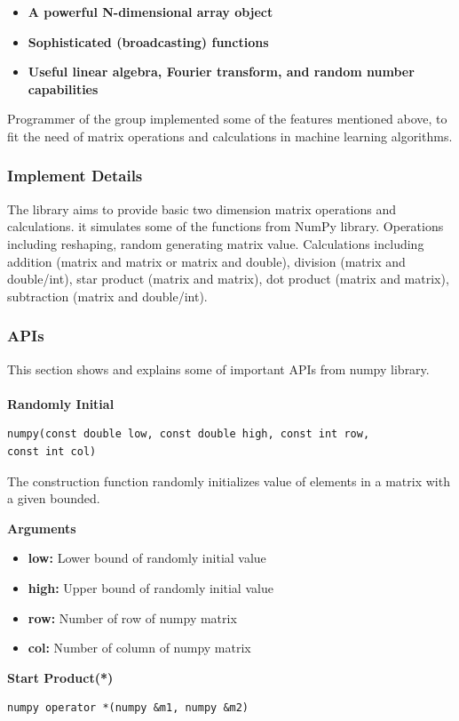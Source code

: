 \documentclass[a4paper]{article}
\begin{document}
\begin{itemize}
	\item{\textbf{A powerful N-dimensional array object}}
    \item{\textbf{Sophisticated (broadcasting) functions} }
    \item{\textbf{Useful linear algebra, Fourier transform, and random number capabilities} }
\end{itemize}

Programmer of the group implemented some of the features mentioned above, to fit the need of matrix operations and calculations in machine learning algorithms.    


\subsubsection{Implement Details}
The library aims to provide basic two dimension matrix operations and calculations. it simulates some of the functions from NumPy library. Operations including reshaping, random generating matrix value. Calculations including addition (matrix and matrix or matrix and double), division (matrix and double/int), star product (matrix and matrix), dot product (matrix and matrix), subtraction (matrix and double/int).

\subsubsection{APIs}                                                                    
This section shows and explains some of important APIs from numpy library.\\\\
\textbf{\Large Randomly Initial}\\           
\begin{lstlisting}[language={[ANSI]C++},keywordstyle=\color{blue!70},commentstyle=\color{red!50!green!50!blue!50},frame=shadowbox, rulesepcolor=\color{red!20!green!20!blue!20}]
numpy(const double low, const double high, const int row, 
const int col)
\end{lstlisting}

The construction function randomly initializes value of elements in a matrix with a given bounded.

\textbf{Arguments}
\begin{itemize}
	\item{\textbf{low:} Lower bound of randomly initial value}
    \item{\textbf{high:} Upper bound of randomly initial value}
    \item{\textbf{row:} Number of row of numpy matrix}
    \item{\textbf{col:} Number of column of numpy matrix}
\end{itemize}
\textbf{\Large Start Product(*)}\\
\begin{lstlisting}[language={[ANSI]C++},keywordstyle=\color{blue!70},commentstyle=\color{red!50!green!50!blue!50},frame=shadowbox, rulesepcolor=\color{red!20!green!20!blue!20}]
numpy operator *(numpy &m1, numpy &m2)
\end{lstlisting}
\end{document}
